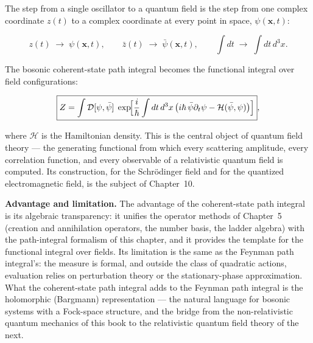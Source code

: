 The step from a single oscillator to a quantum field is the step from one complex coordinate $z(t)$ to a complex coordinate at every point in space, $\psi(\bm x, t)$:
\begin{linenomath}
\begin{equation}
z(t) \;\longrightarrow\; \psi(\bm x, t),
\qquad
\bar z(t) \;\longrightarrow\; \bar\psi(\bm x, t),
\qquad
\int dt \;\longrightarrow\; \int dt\,d^{3}x.
\label{eq:field-limit}
\end{equation}
\end{linenomath}
The bosonic coherent-state path integral becomes the functional integral over field configurations:
\begin{linenomath}
\begin{equation}
\boxed{Z = \int\mathcal{D}[\psi,\bar\psi]\;
\exp\!\Bigl[\frac{i}{\hbar}\int dt\,d^{3}x\,
\bigl(i\hbar\,\bar\psi\partial_{t}\psi - \mathcal{H}(\bar\psi,\psi)\bigr)\Bigr]},
\label{eq:field-functional-integral}
\end{equation}
\end{linenomath}
where $\mathcal{H}$ is the Hamiltonian density. This is the central object of quantum field theory --- the generating functional from which every scattering amplitude, every correlation function, and every observable of a relativistic quantum field is computed. Its construction, for the Schr\"odinger field and for the quantized electromagnetic field, is the subject of Chapter~10.

\medskip\noindent\textbf{Advantage and limitation.} The advantage of the coherent-state path integral is its algebraic transparency: it unifies the operator methods of Chapter~5 (creation and annihilation operators, the number basis, the ladder algebra) with the path-integral formalism of this chapter, and it provides the template for the functional integral over fields. Its limitation is the same as the Feynman path integral's: the measure is formal, and outside the class of quadratic actions, evaluation relies on perturbation theory or the stationary-phase approximation. What the coherent-state path integral adds to the Feynman path integral is the holomorphic (Bargmann) representation --- the natural language for bosonic systems with a Fock-space structure, and the bridge from the non-relativistic quantum mechanics of this book to the relativistic quantum field theory of the next.

